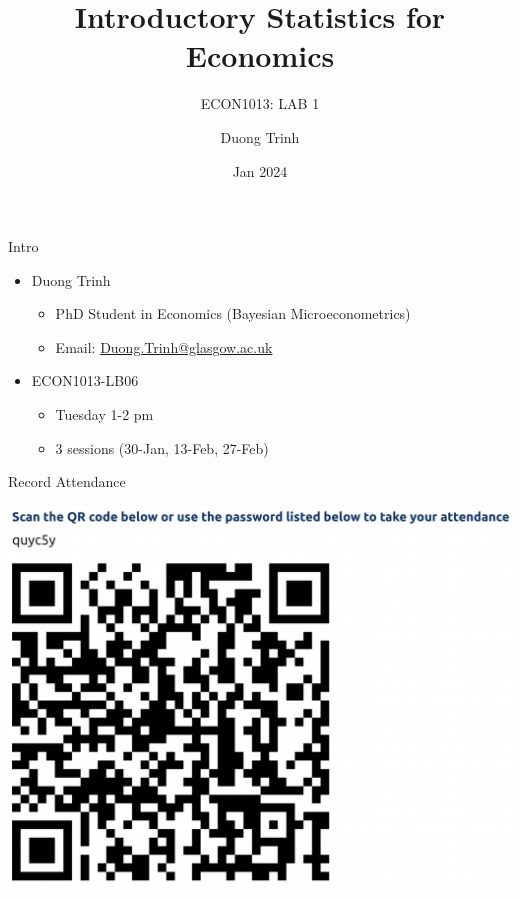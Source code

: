 \documentclass[
  10pt,
  ignorenonframetext,
]{beamer}
\title{Introductory Statistics for Economics}
\subtitle{ECON1013: LAB 1}
\author{Duong Trinh}
\date{Jan 2024}
\institute{University of Glasgow}
\providecommand{\tightlist}{%
  \setlength{\itemsep}{0pt}\setlength{\parskip}{0pt}}
\begin{document}
\frame{\titlepage}

\begin{frame}{Intro}
\protect\hypertarget{intro}{}
\begin{itemize}
\tightlist
\item
  Duong Trinh

  \begin{itemize}
  \tightlist
  \item
    PhD Student in Economics (Bayesian Microeconometrics)
  \item
    Email: \underline{Duong.Trinh@glasgow.ac.uk}
  \end{itemize}
\end{itemize}

\vspace{3mm}

\begin{itemize}
\tightlist
\item
  ECON1013-LB06

  \begin{itemize}
  \tightlist
  \item
    Tuesday 1-2 pm
  \item
    3 sessions (30-Jan, 13-Feb, 27-Feb)
  \end{itemize}
\end{itemize}

\vspace{3mm}
\end{frame}

\begin{frame}{Record Attendance}
\protect\hypertarget{record-attendance}{}
\begin{center}\includegraphics[width=0.8\linewidth]{pictures/QRcodeAtd_LB06} \end{center}
\end{frame}
\end{document}
